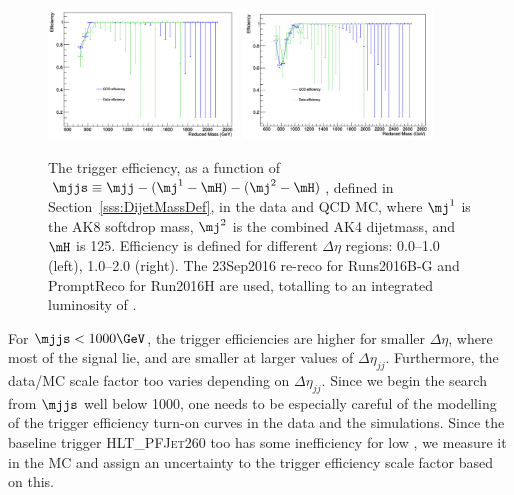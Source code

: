 \begin{figure}[h]
  \begin{center}  
    \includegraphics[width=0.45\textwidth]{F5/trigefDeta0v2.pdf} 
    \includegraphics[width=0.45\textwidth]{F5/trigefDeta1v2.pdf} 

  \end{center}
  \caption{The trigger efficiency, as a function of $\mjjs \equiv \mjj - (\mj^{1}-\mH) - (\mj^{2}-\mH)$, defined in Section~\ref{sss:DijetMassDef}, in the data and QCD MC, where $\mj^{1}$ is the AK8 softdrop mass, $\mj^{2}$ is the combined AK4 dijetmass, and $\mH$ is 125. Efficiency is defined for different $\Delta\eta$ regions: 0.0--1.0 (left), 1.0--2.0 (right).%
 The 23Sep2016 re-reco for Runs2016B-G and PromptReco for Run2016H are used, totalling to an integrated luminosity of \intLumi.}
  \label{fig:trigeEffvsMjj_JetHT_DetaBins}
\end{figure}

For $\mjjs < 1000\GeV$, the trigger efficiencies are higher for smaller $\Delta\eta$, where most of the signal lie, and are smaller at larger values of $\Delta\eta_{jj}$. Furthermore, the data/MC scale factor too varies depending on $\Delta\eta_{jj}$. Since we begin the search from $\mjjs$ well below 1000\GeV, one needs to be especially careful of the modelling of the trigger efficiency turn-on curves in the data and the simulations. Since the baseline trigger \textsc{HLT\_PFJet260} too has some inefficiency for low \mjjs, we measure it in the MC and assign an uncertainty to the trigger efficiency scale factor based on this. 

